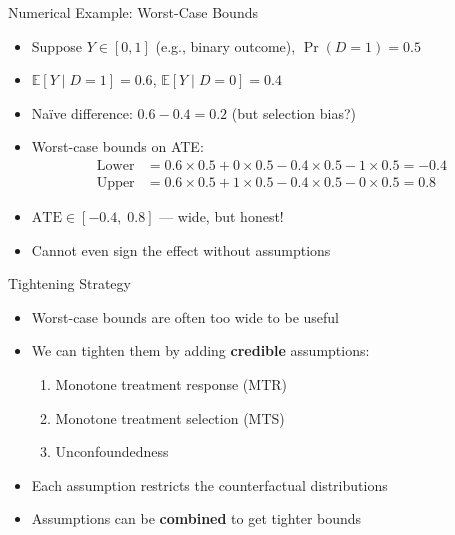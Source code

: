 \documentclass[10pt]{beamer}
\newcommand{\E}{\mathbb{E}}
\begin{document}
\begin{frame}{Numerical Example: Worst-Case Bounds}
  \begin{itemize}
    \item Suppose $Y \in [0, 1]$ (e.g., binary outcome), $\Pr(D=1) = 0.5$
    \item $\E[Y \mid D=1] = 0.6$, \quad $\E[Y \mid D=0] = 0.4$
    \item Na\"ive difference: $0.6 - 0.4 = 0.2$ (but selection bias?)
    \item Worst-case bounds on ATE:
    \begin{align*}
      \text{Lower} &= 0.6 \times 0.5 + 0 \times 0.5 - 0.4 \times 0.5 - 1 \times 0.5 = -0.4 \\
      \text{Upper} &= 0.6 \times 0.5 + 1 \times 0.5 - 0.4 \times 0.5 - 0 \times 0.5 = 0.8
    \end{align*}
    \item $\text{ATE} \in [-0.4,\; 0.8]$ --- wide, but honest!
    \item Cannot even sign the effect without assumptions
  \end{itemize}
\end{frame}


\begin{frame}{Tightening Strategy}
  \begin{itemize}
    \item Worst-case bounds are often too wide to be useful
      \item We can tighten them by adding \textbf{credible} assumptions:
      \begin{enumerate}
        \item Monotone treatment response (MTR)
        \item Monotone treatment selection (MTS)
        \item Unconfoundedness
      \end{enumerate}
      \item Each assumption restricts the counterfactual distributions
      \item Assumptions can be \textbf{combined} to get tighter bounds
  \end{itemize}
\end{frame}
\end{document}
